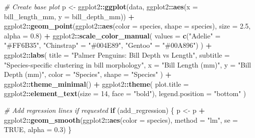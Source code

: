 \documentclass[
]{article}
\newenvironment{Shaded}{\begin{snugshade}}{\end{snugshade}}
\newcommand{\AttributeTok}[1]{\textcolor[rgb]{0.13,0.29,0.53}{#1}}
\newcommand{\CommentTok}[1]{\textcolor[rgb]{0.56,0.35,0.01}{\textit{#1}}}
\newcommand{\ConstantTok}[1]{\textcolor[rgb]{0.56,0.35,0.01}{#1}}
\newcommand{\ControlFlowTok}[1]{\textcolor[rgb]{0.13,0.29,0.53}{\textbf{#1}}}
\newcommand{\DecValTok}[1]{\textcolor[rgb]{0.00,0.00,0.81}{#1}}
\newcommand{\FloatTok}[1]{\textcolor[rgb]{0.00,0.00,0.81}{#1}}
\newcommand{\FunctionTok}[1]{\textcolor[rgb]{0.13,0.29,0.53}{\textbf{#1}}}
\newcommand{\NormalTok}[1]{#1}
\newcommand{\OtherTok}[1]{\textcolor[rgb]{0.56,0.35,0.01}{#1}}
\newcommand{\SpecialCharTok}[1]{\textcolor[rgb]{0.81,0.36,0.00}{\textbf{#1}}}
\newcommand{\StringTok}[1]{\textcolor[rgb]{0.31,0.60,0.02}{#1}}
\begin{document}
\begin{Shaded}
\begin{Highlighting}[]
  \CommentTok{\# Create base plot}
\NormalTok{  p }\OtherTok{\textless{}{-}}\NormalTok{ ggplot2}\SpecialCharTok{::}\FunctionTok{ggplot}\NormalTok{(data, ggplot2}\SpecialCharTok{::}\FunctionTok{aes}\NormalTok{(}\AttributeTok{x =}\NormalTok{ bill\_length\_mm, }\AttributeTok{y =}\NormalTok{ bill\_depth\_mm)) }\SpecialCharTok{+}
\NormalTok{    ggplot2}\SpecialCharTok{::}\FunctionTok{geom\_point}\NormalTok{(ggplot2}\SpecialCharTok{::}\FunctionTok{aes}\NormalTok{(}\AttributeTok{color =}\NormalTok{ species, }\AttributeTok{shape =}\NormalTok{ species),}
                       \AttributeTok{size =} \FloatTok{2.5}\NormalTok{, }\AttributeTok{alpha =} \FloatTok{0.8}\NormalTok{) }\SpecialCharTok{+}
\NormalTok{    ggplot2}\SpecialCharTok{::}\FunctionTok{scale\_color\_manual}\NormalTok{(}
      \AttributeTok{values =} \FunctionTok{c}\NormalTok{(}\StringTok{"Adelie"} \OtherTok{=} \StringTok{"\#FF6B35"}\NormalTok{, }\StringTok{"Chinstrap"} \OtherTok{=} \StringTok{"\#004E89"}\NormalTok{, }\StringTok{"Gentoo"} \OtherTok{=} \StringTok{"\#00A896"}\NormalTok{)}
\NormalTok{    ) }\SpecialCharTok{+}
\NormalTok{    ggplot2}\SpecialCharTok{::}\FunctionTok{labs}\NormalTok{(}
      \AttributeTok{title =} \StringTok{"Palmer Penguins: Bill Depth vs Length"}\NormalTok{,}
      \AttributeTok{subtitle =} \StringTok{"Species{-}specific clustering in bill morphology"}\NormalTok{,}
      \AttributeTok{x =} \StringTok{"Bill Length (mm)"}\NormalTok{,}
      \AttributeTok{y =} \StringTok{"Bill Depth (mm)"}\NormalTok{,}
      \AttributeTok{color =} \StringTok{"Species"}\NormalTok{,}
      \AttributeTok{shape =} \StringTok{"Species"}
\NormalTok{    ) }\SpecialCharTok{+}
\NormalTok{    ggplot2}\SpecialCharTok{::}\FunctionTok{theme\_minimal}\NormalTok{() }\SpecialCharTok{+}
\NormalTok{    ggplot2}\SpecialCharTok{::}\FunctionTok{theme}\NormalTok{(}
      \AttributeTok{plot.title =}\NormalTok{ ggplot2}\SpecialCharTok{::}\FunctionTok{element\_text}\NormalTok{(}\AttributeTok{size =} \DecValTok{14}\NormalTok{, }\AttributeTok{face =} \StringTok{"bold"}\NormalTok{),}
      \AttributeTok{legend.position =} \StringTok{"bottom"}
\NormalTok{    )}

  \CommentTok{\# Add regression lines if requested}
  \ControlFlowTok{if}\NormalTok{ (add\_regression) \{}
\NormalTok{    p }\OtherTok{\textless{}{-}}\NormalTok{ p }\SpecialCharTok{+}\NormalTok{ ggplot2}\SpecialCharTok{::}\FunctionTok{geom\_smooth}\NormalTok{(ggplot2}\SpecialCharTok{::}\FunctionTok{aes}\NormalTok{(}\AttributeTok{color =}\NormalTok{ species),}
                                 \AttributeTok{method =} \StringTok{"lm"}\NormalTok{, }\AttributeTok{se =} \ConstantTok{TRUE}\NormalTok{, }\AttributeTok{alpha =} \FloatTok{0.3}\NormalTok{)}
\NormalTok{  \}}


\end{Highlighting}
\end{Shaded}
\end{document}
